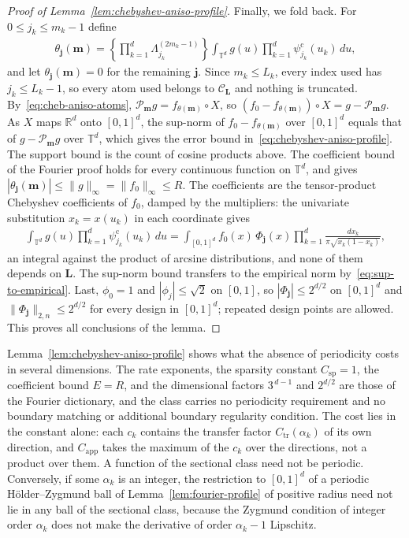 \begin{proof}[Proof of Lemma~\ref{lem:chebyshev-aniso-profile}]
Finally, we fold back. For $0\leq j_k\leq m_k-1$ define
\begin{align*}
\theta_{\boldsymbol j}(\boldsymbol m)
=\left\{\prod_{k=1}^d\Lambda^{(2m_k-1)}_{j_k}\right\}
\int_{\mathbb T^d}g(u)\prod_{k=1}^d\psi^{\mathrm c}_{j_k}(u_k)\,du,
\end{align*}
and let $\theta_{\boldsymbol j}(\boldsymbol m)=0$ for the remaining $\boldsymbol j$. Since $m_k\leq L_k$, every index used has $j_k\leq L_k-1$, so every atom used belongs to $\mathcal C_{\boldsymbol L}$ and nothing is truncated. By~\eqref{eq:cheb-aniso-atoms}, $\mathcal P_{\boldsymbol m}g=f_{\theta(\boldsymbol m)}\circ X$, so $(f_0-f_{\theta(\boldsymbol m)})\circ X=g-\mathcal P_{\boldsymbol m}g$. As $X$ maps $\mathbb R^d$ onto $[0,1]^d$, the sup-norm of $f_0-f_{\theta(\boldsymbol m)}$ over $[0,1]^d$ equals that of $g-\mathcal P_{\boldsymbol m}g$ over $\mathbb T^d$, which gives the error bound in~\eqref{eq:chebyshev-aniso-profile}. The support bound is the count of cosine products above. The coefficient bound of the Fourier proof holds for every continuous function on $\mathbb T^d$, and gives $|\theta_{\boldsymbol j}(\boldsymbol m)|\leq\|g\|_\infty=\|f_0\|_\infty\leq R$. The coefficients are the tensor-product Chebyshev coefficients of $f_0$, damped by the multipliers: the univariate substitution $x_k=x(u_k)$ in each coordinate gives
\begin{align*}
\int_{\mathbb T^d}g(u)\prod_{k=1}^d\psi^{\mathrm c}_{j_k}(u_k)\,du
=\int_{[0,1]^d}f_0(x)\,\Phi_{\boldsymbol j}(x)\prod_{k=1}^d\frac{dx_k}{\pi\sqrt{x_k(1-x_k)}},
\end{align*}
an integral against the product of arcsine distributions, and none of them depends on $\boldsymbol L$. The sup-norm bound transfers to the empirical norm by~\eqref{eq:sup-to-empirical}. Last, $\phi_0=1$ and $|\phi_j|\leq\sqrt2$ on $[0,1]$, so $|\Phi_{\boldsymbol j}|\leq2^{d/2}$ on $[0,1]^d$ and $\|\Phi_{\boldsymbol j}\|_{2,n}\leq2^{d/2}$ for every design in $[0,1]^d$; repeated design points are allowed. This proves all conclusions of the lemma.
\end{proof}

Lemma~\ref{lem:chebyshev-aniso-profile} shows what the absence of periodicity costs in several dimensions. The rate exponents, the sparsity constant $C_{\mathrm{sp}}=1$, the coefficient bound $E=R$, and the dimensional factors $3^{\,d-1}$ and $2^{d/2}$ are those of the Fourier dictionary, and the class carries no periodicity requirement and no boundary matching or additional boundary regularity condition. The cost lies in the constant alone: each $c_k$ contains the transfer factor $C_{\mathrm{tr}}(\alpha_k)$ of its own direction, and $C_{\mathrm{app}}$ takes the maximum of the $c_k$ over the directions, not a product over them. A function of the sectional class need not be periodic. Conversely, if some $\alpha_k$ is an integer, the restriction to $[0,1]^d$ of a periodic H\"older--Zygmund ball of Lemma~\ref{lem:fourier-profile} of positive radius need not lie in any ball of the sectional class, because the Zygmund condition of integer order $\alpha_k$ does not make the derivative of order $\alpha_k-1$ Lipschitz.

